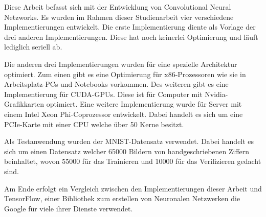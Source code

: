 \documentclass[../main.tex]{subfiles}
\begin{document}
Diese Arbeit befasst sich mit der Entwicklung von Convolutional Neural Netzworks. Es wurden im Rahmen dieser Studienarbeit vier verschiedene Implementierungen entwickelt. Die erste Implementierung diente als Vorlage der drei anderen Implementierungen. Diese hat noch keinerlei Optimierung und läuft lediglich seriell ab.

Die anderen drei Implementierungen wurden für eine spezielle Architektur optimiert. Zum einen gibt es eine Optimierung für x86-Prozessoren wie sie in Arbeitsplatz-PCs und Notebooks vorkommen. Des weiteren gibt es eine Implementierung für CUDA-GPUs. Diese ist für Computer mit Nvidia-Grafikkarten optimiert. Eine weitere Implementierung wurde für Server mit einem Intel Xeon Phi-Coprozessor entwickelt. Dabei handelt es sich um eine PCIe-Karte mit einer CPU welche über 50 Kerne besitzt.

Als Testanwendung wurden der MNIST-Datensatz verwendet. Dabei handelt es sich um einen Datensatz welcher 65000 Bildern von handgeschriebenen Ziffern beinhaltet, wovon 55000 für das Trainieren und 10000 für das Verifizieren gedacht sind.

Am Ende erfolgt ein Vergleich zwischen den Implementierungen dieser Arbeit und TensorFlow, einer Bibliothek zum erstellen von Neuronalen Netzwerken die Google für viele ihrer Dienste verwendet.
\end{document}
